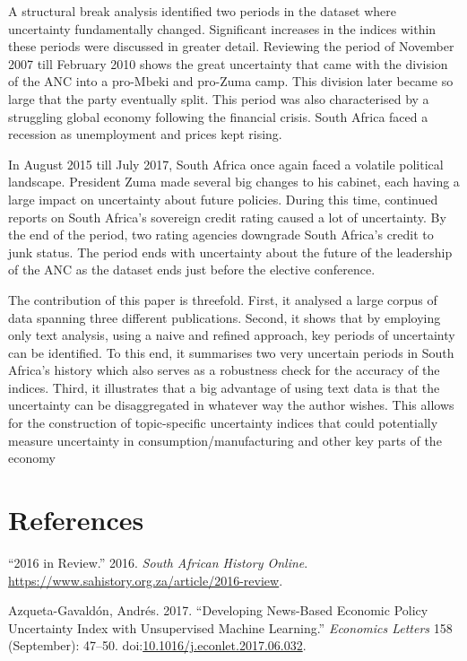 \documentclass[11pt,preprint, authoryear]{elsarticle}
\numberwithin{equation}{section}
\numberwithin{figure}{section}
\numberwithin{table}{section}
\begin{document}
A structural break analysis identified two periods in the dataset where uncertainty fundamentally changed. Significant increases in the indices within these periods were discussed in greater detail. Reviewing the period of November 2007 till February 2010 shows the great uncertainty that came with the division of the ANC into a pro-Mbeki and pro-Zuma camp. This division later became so large that the party eventually split. This period was also characterised by a struggling global economy following the financial crisis. South Africa faced a recession as unemployment and prices kept rising. 

In August 2015 till July 2017, South Africa once again faced a volatile political landscape. President Zuma made several big changes to his cabinet, each having a large impact on uncertainty about future policies. During this time, continued reports on South Africa's sovereign credit rating caused a lot of uncertainty. By the end of the period, two rating agencies downgrade South Africa's credit to junk status. The period ends with uncertainty about the future of the leadership of the ANC as the dataset ends just before the elective conference. 

The contribution of this paper is threefold. First, it analysed a large corpus of data spanning three different publications. Second, it shows that by employing only text analysis, using a naive and refined approach, key periods of uncertainty can be identified. To this end, it summarises two very uncertain periods in South Africa's history which also serves as a robustness check for the accuracy of the indices. Third, it illustrates that a big advantage of using text data is that the uncertainty can be disaggregated in whatever way the author wishes. This allows for the construction of topic-specific uncertainty indices that could potentially measure uncertainty in consumption/manufacturing and other key parts of the economy


\newpage

\section*{References}\label{references}

\hypertarget{refs}{}
\hypertarget{ref-2016}{}
``2016 in Review.'' 2016. \emph{South African History Online}.
\url{https://www.sahistory.org.za/article/2016-review}.

\hypertarget{ref-Azqueta-Gavaldon2017}{}
Azqueta-Gavaldón, Andrés. 2017. ``Developing News-Based Economic Policy
Uncertainty Index with Unsupervised Machine Learning.'' \emph{Economics
Letters} 158 (September): 47--50.
doi:\href{https://doi.org/10.1016/j.econlet.2017.06.032}{10.1016/j.econlet.2017.06.032}.
\end{document}
